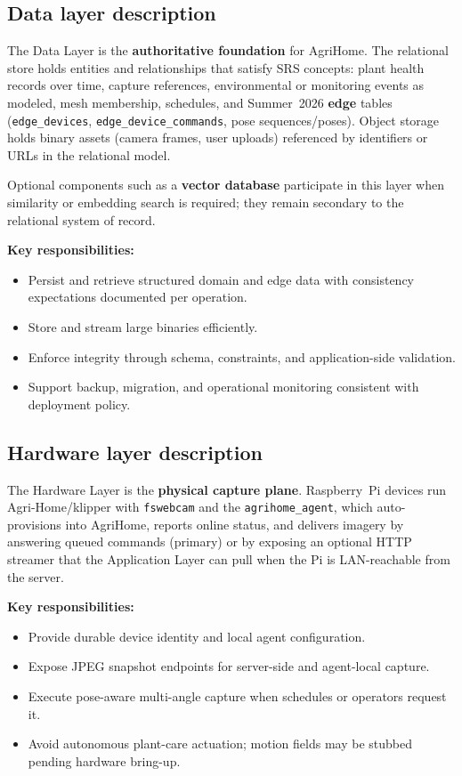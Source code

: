 \subsection{Data layer description}

The Data Layer is the \textbf{authoritative foundation} for AgriHome. The relational store holds entities and relationships that satisfy SRS concepts: plant health records over time, capture references, environmental or monitoring events as modeled, mesh membership, schedules, and Summer~2026 \textbf{edge} tables (\texttt{edge\_devices}, \texttt{edge\_device\_commands}, pose sequences/poses). Object storage holds binary assets (camera frames, user uploads) referenced by identifiers or URLs in the relational model.

Optional components such as a \textbf{vector database} participate in this layer when similarity or embedding search is required; they remain secondary to the relational system of record.

\textbf{Key responsibilities:}
\begin{itemize}
  \item Persist and retrieve structured domain and edge data with consistency expectations documented per operation.
  \item Store and stream large binaries efficiently.
  \item Enforce integrity through schema, constraints, and application-side validation.
  \item Support backup, migration, and operational monitoring consistent with deployment policy.
\end{itemize}

\subsection{Hardware layer description}

The Hardware Layer is the \textbf{physical capture plane}. Raspberry~Pi devices run Agri-Home/klipper with \texttt{fswebcam} and the \texttt{agrihome\_agent}, which auto-provisions into AgriHome, reports online status, and delivers imagery by answering queued commands (primary) or by exposing an optional HTTP streamer that the Application Layer can pull when the Pi is LAN-reachable from the server.

\textbf{Key responsibilities:}
\begin{itemize}
  \item Provide durable device identity and local agent configuration.
  \item Expose JPEG snapshot endpoints for server-side and agent-local capture.
  \item Execute pose-aware multi-angle capture when schedules or operators request it.
  \item Avoid autonomous plant-care actuation; motion fields may be stubbed pending hardware bring-up.
\end{itemize}

